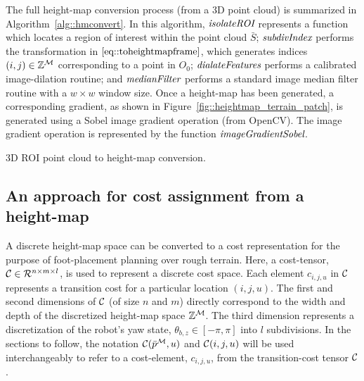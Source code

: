 			The full height-map conversion process (from a 3D point cloud) is summarized in Algorithm~\ref{alg::hmconvert}. In this algorithm, $\emph{\text{isolateROI}}$ represents a function which locates a region of interest within the point cloud $\bar{S}$; $\emph{\text{subdivIndex}}$ performs the transformation in $\ref{eq::toheightmapframe}$, which generates indices $(i,j)\in{\Bbb Z}^{{\cal M}}$ corresponding to a point in $O_{0}$; $\emph{\text{dialateFeatures}}$ performs a calibrated image-dilation routine; and $\emph{\text{medianFilter}}$ performs a standard image median filter routine with a $w\times w$ window size. Once a height-map has been generated, a corresponding gradient, as shown in Figure~\ref{fig::heightmap_terrain_patch}, is generated using a Sobel image gradient operation (from OpenCV). The image gradient operation is represented by the function $\emph{\text{imageGradientSobel}}$.

			\begin{algorithm}[!h]
				\begin{algorithmic}
						\EndIf
					\EndFor
				\end{algorithmic}	
				\caption{3D ROI point cloud to height-map conversion.}
				\label{alg::hmconvert}
			\end{algorithm}






		\subsection{An approach for cost assignment from a height-map}

			A discrete height-map space can be converted to a cost representation for the purpose of foot-placement planning over rough terrain. Here, a cost-tensor, ${\cal C}\in{\cal R}^{n\times m\times l}$, is used to represent a discrete cost space. Each element $c_{i,j,u}$ in ${\cal C}$ represents a transition cost for a particular location $(i,j,u)$. The first and second dimensions of ${\cal C}$ (of size $n$ and $m$) directly correspond to the width and depth of the discretized height-map space $\mathbb{Z}^{{\cal M}}$. The third dimension represents a discretization of the robot's yaw state, $\theta_{b,z}\in[-\pi,\pi]$ into $l$ subdivisions.  In the sections to follow, the notation ${\cal C}(\bar{p}^{{\cal M}},u)$ and ${\cal C}(i,j,u)$ will be used interchangeably to refer to a cost-element, $c_{i,j,u}$, from the transition-cost tensor ${\cal C}$.


